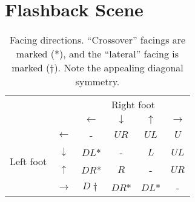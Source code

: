 \documentclass[10pt]{sigplanconf}
\begin{document}

\section{Flashback Scene}


\begin{table}[h]
	\begin{center}
	\begin{tabular}{cc|cccc}
		& & \multicolumn{4}{c}{Right foot} \\
		& & $\leftarrow$ & $\downarrow$ & $\uparrow$ & $\rightarrow$ \\
		\hline
		\multirow{4}{*}{Left foot}
		& $\leftarrow$  & - & $UR$ & $UL$ & $U$ \\
		& $\downarrow$  & $DL$* & - & $L$ & $UL$ \\
		& $\uparrow$    & $DR$* & $R$ & - & $UR$ \\
		& $\rightarrow$ & $D\dagger$ & $DR$* & $DL$* & - \\

	\end{tabular}
	\end{center}
	\caption{Facing directions. ``Crossover'' facings are marked (*), and the ``lateral'' facing is marked ($\dagger$). Note the appealing diagonal symmetry.}
	\label{tab:facing}
\end{table}



\newcommand\hilight[2]{\color{#1}#2\color{black}}
\end{document}
